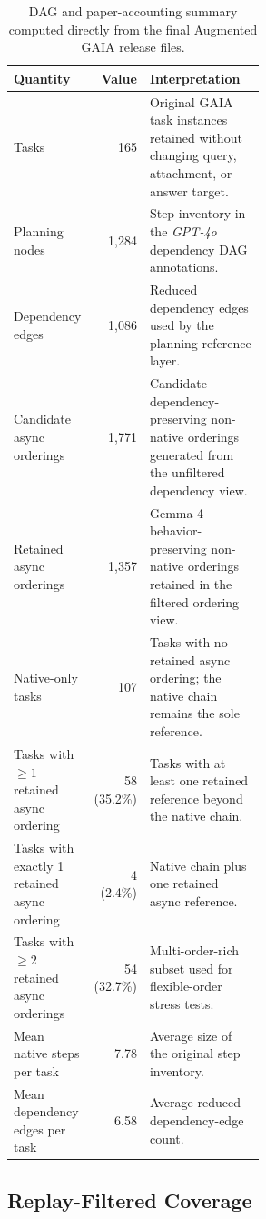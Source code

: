 \documentclass{article}
\providecommand{\model}[1]{\emph{#1}}
\begin{document}
\begin{table}[H]
\centering
\scriptsize
\setlength{\tabcolsep}{3pt}
\begin{tabular}{l r p{0.55\linewidth}}
\toprule
Quantity & Value & Interpretation \\
\midrule
Tasks & 165 & Original GAIA task instances retained without changing query, attachment, or answer target. \\
Planning nodes & 1{,}284 & Step inventory in the \model{GPT-4o} dependency DAG annotations. \\
Dependency edges & 1{,}086 & Reduced dependency edges used by the planning-reference layer. \\
Candidate async orderings & 1{,}771 & Candidate dependency-preserving non-native orderings generated from the unfiltered dependency view. \\
Retained async orderings & 1{,}357 & Gemma 4 behavior-preserving non-native orderings retained in the filtered ordering view. \\
Native-only tasks & 107 & Tasks with no retained async ordering; the native chain remains the sole reference. \\
Tasks with $\geq 1$ retained async ordering & 58 (35.2\%) & Tasks with at least one retained reference beyond the native chain. \\
Tasks with exactly 1 retained async ordering & 4 (2.4\%) & Native chain plus one retained async reference. \\
Tasks with $\geq 2$ retained async orderings & 54 (32.7\%) & Multi-order-rich subset used for flexible-order stress tests. \\
Mean native steps per task & 7.78 & Average size of the original step inventory. \\
Mean dependency edges per task & 6.58 & Average reduced dependency-edge count. \\
\bottomrule
\end{tabular}
\vspace{0.01cm}
\caption{DAG and paper-accounting summary computed directly from the final Augmented GAIA release files.}
\label{tab:appendix-augmented-gaia-accounting}
\end{table}

\subsection{Replay-Filtered Coverage}
\label{subsec:appendix-data-coverage}
\end{document}
